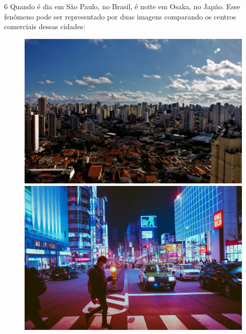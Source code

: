\num{6} Quando é dia em São Paulo, no Brasil, é noite em Osaka, no
Japão. Esse fenômeno pode ser representado por duas imagens comparando
os centros comerciais dessas cidades:

\begin{figure}[htpb!]
\includegraphics[width=\textwidth]{./imgs/img4.png}
\includegraphics[width=\textwidth]{./imgs/img5.png}
\end{figure}

